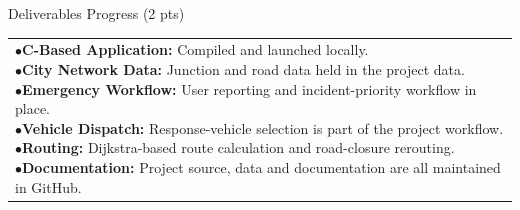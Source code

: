\documentclass[12pt,a4paper]{article}
\newcommand{\sectiontitle}[1]{%
    {\color{GEUBlue}
    \fontsize{18}{22}\selectfont #1}
}
\newcommand{\answerbox}[2]{%
    \noindent
    \begin{tabularx}{\textwidth}{
        |>{\raggedright\arraybackslash}X|}
        \hline
        \parbox[t]{\dimexpr\linewidth-12pt\relax}{%
            \vspace{5pt}
            \fontsize{11}{13}\selectfont #2
            \vspace{5pt}
        }\\
        \hline
    \end{tabularx}
}
\begin{document}
\vspace{0.65cm}

\Needspace{5cm}\sectiontitle{Deliverables Progress (2 pts)}

\vspace{0.40cm}

\answerbox{3.60cm}{%
$\bullet$\enspace\textbf{C-Based Application:} Compiled and launched locally.\\[3pt]
$\bullet$\enspace\textbf{City Network Data:} Junction and road data held in the project data.\\[3pt]
$\bullet$\enspace\textbf{Emergency Workflow:} User reporting and incident-priority workflow in place.\\[3pt]
$\bullet$\enspace\textbf{Vehicle Dispatch:} Response-vehicle selection is part of the project workflow.\\[3pt]
$\bullet$\enspace\textbf{Routing:} Dijkstra-based route calculation and road-closure rerouting.\\[3pt]
$\bullet$\enspace\textbf{Documentation:} Project source, data and documentation are all maintained in GitHub.
}
\end{document}
